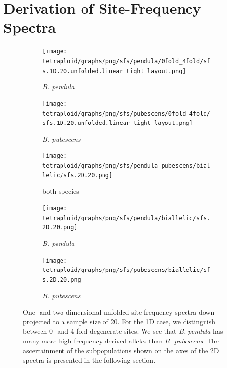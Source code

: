 \documentclass[hidelinks,11pt]{article}
\newcommand{\pendula}{\textit{B. pendula}}
\newcommand{\pubescens}{\textit{B. pubescens}}
\begin{document}
{    \clearpage


    \section{Derivation of Site-Frequency Spectra}
    \label{sec:sfs-derivation}
    
    \begin{figure}[ht]
        \centering
        \begin{subfigure}[b]{0.49\textwidth}
            \centering
            \texttt{[image: tetraploid/graphs/png/sfs/pendula/0fold\_4fold/sfs.1D.20.unfolded.linear\_tight\_layout.png]}
            \caption{\pendula{}}
            \label{fig:sfs_1d_pendula}
        \end{subfigure}
        \hfill
        \begin{subfigure}[b]{0.49\textwidth}
            \centering
            \texttt{[image: tetraploid/graphs/png/sfs/pubescens/0fold\_4fold/sfs.1D.20.unfolded.linear\_tight\_layout.png]}
            \caption{\pubescens{}}
            \label{fig:sfs_1d_pubescens}
        \end{subfigure}
        \par\bigskip
        \centering
        \begin{subfigure}[b]{0.32\textwidth}
            \centering
            \texttt{[image: tetraploid/graphs/png/sfs/pendula\_pubescens/biallelic/sfs.2D.20.png]}
            \caption{both species}
            \label{fig:sfs_2d_pendula_pubescens}
        \end{subfigure}
        \hfill
        \begin{subfigure}[b]{0.32\textwidth}
            \centering
            \texttt{[image: tetraploid/graphs/png/sfs/pendula/biallelic/sfs.2D.20.png]}
            \caption{\pendula{}}
            \label{fig:sfs_2d_pendula}
        \end{subfigure}
        \hfill
        \begin{subfigure}[b]{0.32\textwidth}
            \centering
            \texttt{[image: tetraploid/graphs/png/sfs/pubescens/biallelic/sfs.2D.20.png]}
            \caption{\pubescens{}}
            \label{fig:sfs_2d_pubescens}
        \end{subfigure}
        \caption{One- and two-dimensional unfolded site-frequency spectra down-projected to a sample size of 20. For the 1D case, we distinguish between 0- and 4-fold degenerate sites. We see that \pendula{} has many more high-frequency derived alleles than \pubescens{}. The ascertainment of the subpopulations shown on the axes of the 2D spectra is presented in the following section.}
        \label{fig:sfs}
    \end{figure}

}
\end{document}
